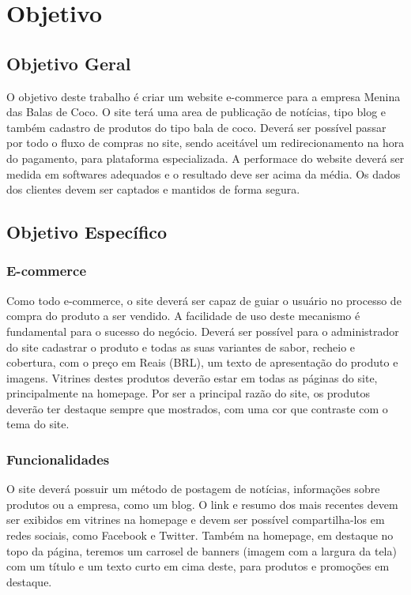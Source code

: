 \chapter{Objetivo}

\section{Objetivo Geral}

O objetivo deste trabalho é criar um website e-commerce para a empresa Menina das Balas de Coco. O site terá uma area de publicação de notícias, tipo blog e também cadastro de produtos do tipo bala de coco. Deverá ser possível passar por todo o fluxo de compras no site, sendo aceitável um redirecionamento na hora do pagamento, para plataforma especializada. A performace do website deverá ser medida em softwares adequados e o resultado deve ser acima da média. Os dados dos clientes devem ser captados e mantidos de forma segura.

\section{Objetivo Específico}

\subsection{E-commerce}

Como todo e-commerce, o site deverá ser capaz de guiar o usuário no processo de compra do produto a ser vendido. A facilidade de uso deste mecanismo é fundamental para o sucesso do negócio. Deverá ser possível para o administrador do site cadastrar o produto e todas as suas variantes de sabor, recheio e cobertura, com o preço em Reais (BRL), um texto de apresentação do produto e imagens. Vitrines destes produtos deverão estar em todas as páginas do site, principalmente na homepage. Por ser a principal razão do site, os produtos deverão ter destaque sempre que mostrados, com uma cor que contraste com o tema do site.

\subsection{Funcionalidades}

O site deverá possuir um método de postagem de notícias, informações sobre produtos ou a empresa, como um blog. O link e resumo dos mais recentes devem ser exibidos em vitrines na homepage e devem ser possível compartilha-los em redes sociais, como Facebook e Twitter. Também na homepage, em destaque no topo da página, teremos um carrosel de banners (imagem com a largura da tela) com um título e um texto curto em cima deste, para produtos e promoções em destaque.

